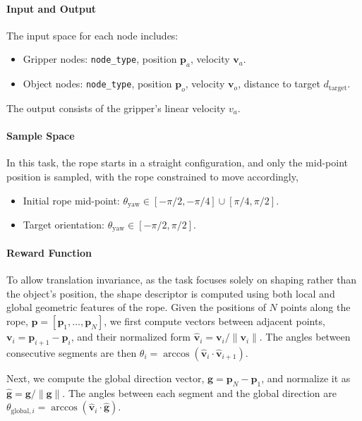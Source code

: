 

\paragraph{Input and Output}
The input space for each node includes:
\begin{itemize}
    \item Gripper nodes: \texttt{node\_type}, position $\mathbf{p}_a$, velocity $\mathbf{v}_a$.
    \item Object nodes: \texttt{node\_type}, position $\mathbf{p}_o$, velocity $\mathbf{v}_o$, distance to target $d_{\text{target}}$.
\end{itemize}
The output consists of the gripper's linear velocity $v_a$. 

\paragraph{Sample Space}
In this task, the rope starts in a straight configuration, and only the mid-point position is sampled, with the rope constrained to move accordingly,
\begin{itemize}
    \item Initial rope mid-point: $\theta_\text{yaw} \in [-\pi / 2, -\pi / 4] \cup [\pi/4, \pi/2]$.
    \item Target orientation: $\theta_\text{yaw} \in [-\pi / 2, \pi / 2]$.
\end{itemize}

\paragraph{Reward Function}
To allow translation invariance, as the task focuses solely on shaping rather than the object's position, the shape descriptor is computed using both local and global geometric features of the rope. Given the positions of $N$ points along the rope, $\mathbf{p} = [\mathbf{p}_1, \dots, \mathbf{p}_N]$, we first compute vectors between adjacent points, $\mathbf{v}_i = \mathbf{p}_{i+1} - \mathbf{p}_i$, and their normalized form $\hat{\mathbf{v}}_i = \mathbf{v}_i / \|\mathbf{v}_i\|$. The angles between consecutive segments are then $\theta_i = \arccos(\hat{\mathbf{v}}_i \cdot \hat{\mathbf{v}}_{i+1})$.

Next, we compute the global direction vector, $\mathbf{g} = \mathbf{p}_N - \mathbf{p}_1$, and normalize it as $\hat{\mathbf{g}} = \mathbf{g} / \|\mathbf{g}\|$. The angles between each segment and the global direction are $\theta_{\text{global}, i} = \arccos(\hat{\mathbf{v}}_i \cdot \hat{\mathbf{g}})$. 

